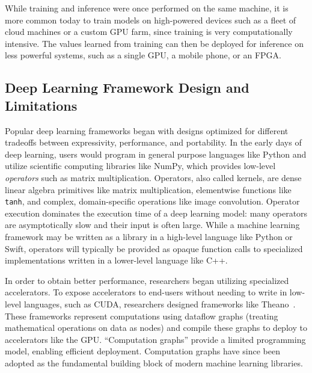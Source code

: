 While training and inference were once performed on the same machine, it is more common today to
train models on high-powered devices such as a fleet of cloud machines or a custom GPU farm, since
training is very computationally intensive. The values learned from training can then be deployed
for inference on less powerful systems, such as a single GPU, a mobile phone, or an FPGA.

\subsection{Deep Learning Framework Design and Limitations}

Popular deep learning frameworks began with designs
  optimized for different tradeoffs between
  expressivity, performance, and portability.
In the early days of deep learning, users would program
  in general purpose languages like Python and utilize
  scientific computing libraries like NumPy,
  which provides low-level \textit{operators} such as matrix multiplication.
Operators, also called kernels, are dense linear algebra primitives like matrix multiplication,
  elementwise functions like \verb|tanh|,
  and complex, domain-specific operations like image convolution.
Operator execution dominates the execution time of a deep learning model: many
  operators are asymptotically slow and their input is often large.
While a machine learning framework may be written as a library in a high-level language
  like Python or Swift, operators will typically be provided as opaque function calls to
  specialized implementations written in a lower-level language like C++.

In order to obtain better performance, researchers began utilizing specialized accelerators.
To expose accelerators to end-users without needing to write in low-level languages,
such as CUDA, researchers designed frameworks like Theano~\citep{theano}.
These frameworks represent computations using dataflow graphs
  (treating mathematical operations on data as nodes)
  and compile these graphs to deploy to
  accelerators like the GPU.
``Computation graphs'' provide a limited programming model,
  enabling efficient deployment.
Computation graphs have since been adopted as the fundamental building block of modern
  machine learning libraries.

